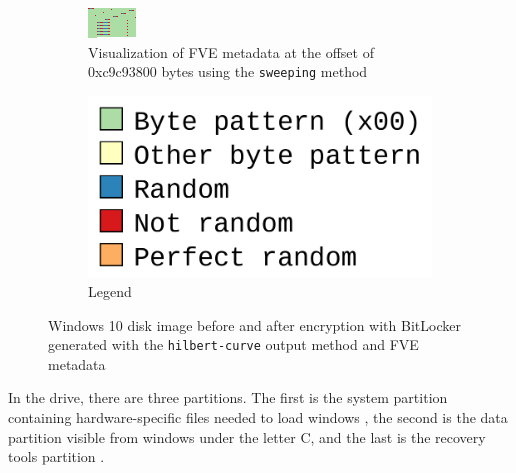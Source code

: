 \documentclass[
  digital, %
  color,   %
  oneside, %
  lof,     %
  nolot,     %
]{fithesis4}
\begin{document}
\begin{figure}
\begin{subfigure}[t]{0.45\textwidth}
    \includegraphics[width=\textwidth,interpolate=false]{fve4.png}
    \caption{Visualization of FVE metadata at the offset of 0xc9c93800 bytes using the \texttt{sweeping} method}
    \label{fig:bitlocker-metadata}
  \end{subfigure}
  \hfill
  \begin{subfigure}[t]{0.45\textwidth}
    \centering
    \includegraphics[width=\textwidth]{legend.png}
    \caption{Legend}
    \label{fig:bitlocker-legend}
  \end{subfigure}
  \caption{Windows 10 disk image before and after encryption with BitLocker generated with the \texttt{hilbert-curve} output method and FVE metadata}
  \label{fig:bitlocker}
\end{figure}

In the drive, there are three partitions.
The first is the system partition containing hardware-specific files needed to load windows \cite{winpart}, the second is the data partition visible from windows under the letter C, and the last is the recovery tools partition \cite{winbiospart}.
\end{document}
